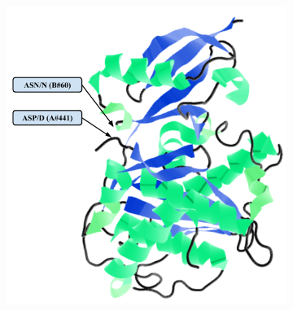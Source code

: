 
\begin{figure}
\centering
\begin{subfigure}{.9\textwidth}
  \centering
  \includegraphics[width=14cm]{figs/gwas_figure_4_jmol.png}
  \label{fig:sub1}
\end{subfigure}%
\begin{subfigure}{.1\textwidth}
  \centering

\end{subfigure}
\end{figure}
